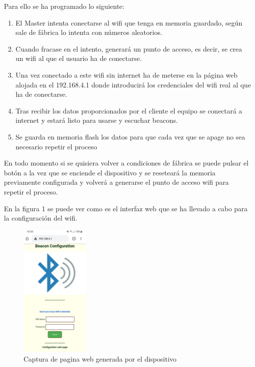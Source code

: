 \documentclass[paper=a4, fontsize=11pt,twoside]{scrartcl}
\begin{document}
            Para ello se ha programado lo siguiente:
            \begin{enumerate}
                \item El Master intenta conectarse al wifi que tenga en memoria guardado, según sale de fábrica lo intenta con números aleatorios.
                \item Cuando fracase en el intento, generará un punto de acceso, es decir, se crea un wifi al que el usuario ha de conectarse.
                \item Una vez conectado a este wifi sin internet ha de meterse en la página web alojada en el 192.168.4.1 donde introducirá los credenciales 
                del wifi real al que ha de conectarse.
                \item Tras recibir los datos proporcionados por el cliente el equipo se conectará a internet y estará listo para usarse y escuchar beacons.
                \item Se guarda en memoria flash los datos para que cada vez que se apage no sea necesario repetir el proceso
            \end{enumerate}
            En todo momento si se quisiera volver a condiciones de fábrica se puede pulsar el botón a la vez que se enciende el dispositivo y se reseteará 
            la memoria previamente configurada y volverá a generarse el punto de acceso wifi para repetir el proceso.
            
            En la figura 1 se puede ver como es el interfaz web que se ha llevado a cabo para la configuración del wifi.
            \begin{center}
                \begin{figure}[]
                    \centering
                    \includegraphics[width=0.3\textwidth]{../../Memmory/images/AP_wifi_config.jpeg}
                    \caption{Captura de pagina web generada por el dispositivo}
                    \label{fig:mesh12}
                \end{figure}
            \end{center}
\end{document}
